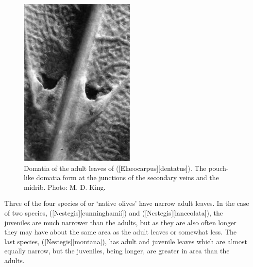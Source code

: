 \begin{figure}[!b]
\begin{minipage}[t]{\textwidth}
\begin{minipage}[t]{(\textwidth-\fgap) * \real{0.502}}
			\centering
			\includegraphics[width=\textwidth]{graphics/fig_023}
			\caption[Domatia of the adult leaves of hinau]{Domatia of the adult leaves of  ([Elaeocarpus][dentatus]).
			The pouch-like domatia form at the junctions of the secondary veins and the midrib.
			Photo: M. D. King.}%
			\label{fig:23hinau}
		\end{minipage}
	\end{minipage}
\end{figure}

Three of the four species of  or `native olives' have narrow adult leaves.
In the case of two species,  ([Nestegis][cunninghamii]) and  ([Nestegis][lanceolata]), the juveniles are much narrower than the adults, but as they are also often longer they may have about the same area as the adult leaves or somewhat less.
The last species, ([Nestegis][montana]), has adult and juvenile leaves which are almost equally narrow, but the juveniles, being longer, are greater in area than the adults.

